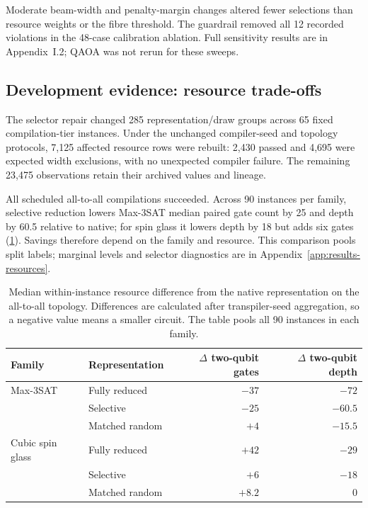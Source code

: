 \documentclass[a4paper,onecolumn,11pt,unpublished]{quantumarticle}
\theoremstyle{remark}
\begin{document}
Moderate beam-width and penalty-margin changes altered fewer selections
than resource weights or the fibre threshold. The guardrail removed all 12
recorded violations in the 48-case calibration ablation. Full sensitivity
results are in Appendix~I.2; QAOA was not rerun for
these sweeps.

\subsection{Development evidence: resource trade-offs}
\label{sec:results-resources}
\label{sec:results-regimes}

The selector repair changed 285 representation/draw groups across 65 fixed
compilation-tier instances. Under the unchanged compiler-seed and topology
protocols, 7,125 affected resource rows were rebuilt: 2,430 passed and 4,695
were expected width exclusions, with no unexpected compiler failure. The
remaining 23,475 observations retain their archived values and lineage.

All scheduled all-to-all compilations succeeded. Across 90 instances per
family, selective reduction lowers Max-3SAT median paired gate count by 25
and depth by 60.5 relative to native; for spin glass it lowers depth by 18
but adds six gates (\cref{tab:e2-all-to-all-paired}). Savings therefore
depend on the family and resource. This comparison pools split labels;
marginal levels and selector diagnostics are in
Appendix~\ref{app:results-resources}.

\begin{table}[!htbp]
    \centering
    \small
    \caption{Median within-instance resource difference from the native
    representation on the all-to-all topology.  Differences are calculated
    after transpiler-seed aggregation, so a negative value means a smaller
    circuit.  The table pools all 90 instances in each family.}
    \label{tab:e2-all-to-all-paired}
    \begin{tabular}{@{}llrr@{}}
        \toprule
        Family & Representation
        & $\Delta$ two-qubit gates & $\Delta$ two-qubit depth\\
        \midrule
        Max-3SAT & Fully reduced  & $-37$ & $-72$\\
                 & Selective      & $-25$ & $-60.5$\\
                 & Matched random & $+4$  & $-15.5$\\
        \addlinespace
        Cubic spin glass & Fully reduced  & $+42$ & $-29$\\
                         & Selective      & $+6$  & $-18$\\
                         & Matched random & $+8.2$ & $0$\\
        \bottomrule
    \end{tabular}
\end{table}
\end{document}
